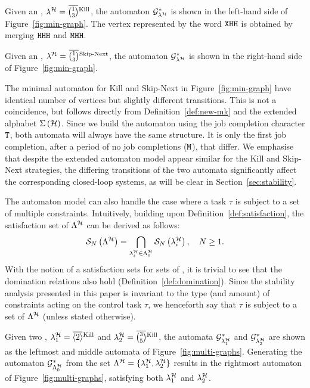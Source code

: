 \begin{example}%
    \label{ex:auto-kill}%
    Given an \ewhc{}, $\lambda^{\strat} = \overbar{\binom{1}{3}}^{\text{Kill}}$, the automaton $\mathcal{G}_{\lambda^{\mathcal{H}}}^*$ is shown in the left-hand side of Figure~\ref{fig:min-graph}.
    The vertex represented by the word $\texttt{X}\texttt{H}\texttt{H}$ is obtained by merging $\texttt{H}\texttt{H}\texttt{H}$ and $\texttt{M}\texttt{H}\texttt{H}$.
\end{example}

\begin{example}%
    \label{ex:auto-skip}%
    Given an \ewhc{}, $\lambda^{\strat} = \overbar{\binom{1}{3}}^{\text{Skip-Next}}$, the automaton $\mathcal{G}_{\lambda^{\mathcal{H}}}^*$ is shown in the right-hand side of Figure~\ref{fig:min-graph}.
\end{example}

The minimal automaton for Kill and Skip-Next in Figure~\ref{fig:min-graph} have identical number of vertices but slightly different transitions.
This is not a coincidence, but follows directly from Definition~\ref{def:new-mk} and the extended alphabet $\Sigma\left(\mathcal{H}\right)$.
Since we build the automaton using the job completion character $\texttt{T}$, both automata will always have the same structure.
It is only the first job completion, after a period of no job completions ($\texttt{M}$), that differ.
We emphasise that despite the extended automaton model appear similar for the Kill and Skip-Next strategies, the differing transitions of the two automata significantly affect the corresponding closed-loop systems, as will be clear in Section~\ref{sec:stability}.


The \tool{} automaton model can also handle the case where a task $\tau$ is subject to a set of multiple constraints.
Intuitively, building upon Definition~\ref{def:satisfaction}, the satisfaction set of $\Lambda^{\mathcal{H}}$ can be derived as follows:
%
\begin{equation}
    \label{eq:satisfaction-multi}
    \sset{N}{\Lambda^{\strat}} = \bigcap_{\lambda^{\strat}_i \in \Lambda^{\strat}_0} \sset{N}{\lambda^{\strat}_i}, \quad N \geq 1.
\end{equation}
%
With the notion of a satisfaction sets for sets of \ewhc{}, it is trivial to see that the domination relations also hold (Definition~\ref{def:domination}).
Since the stability analysis presented in this paper is invariant to the type (and amount) of constraints acting on the control task $\tau$, we henceforth say that $\tau$ is subject to a set of \ewhc{} $\Lambda^{\mathcal{H}}$ (unless stated otherwise).
%
\begin{example}%
    \label{ex:auto-comb}%
    Given two \ewhc{}, $\lambda^{\strat}_1 = \overbar{\left<2\right>}^{\text{Kill}}$ and $\lambda^{\strat}_2 = \overbar{\binom{3}{5}}^{\text{Kill}}$, the automata $\mathcal{G}_{\lambda^{\mathcal{H}}_1}^*$ and $\mathcal{G}_{\lambda^{\mathcal{H}}_2}^*$ are shown as the leftmost and middle automata of Figure~\ref{fig:multi-graphs}.
    Generating the automaton $\mathcal{G}_{\Lambda^{\mathcal{H}}_0}^*$ from the set $\Lambda^{\mathcal{H}} = \{ \lambda^{\mathcal{H}}_1, \lambda^{\mathcal{H}}_2 \}$ results in the rightmost automaton of Figure~\ref{fig:multi-graphs}, satisfying both $\lambda^{\mathcal{H}}_1$ and $\lambda^{\mathcal{H}}_2$.
    \fix{}
\end{example}


